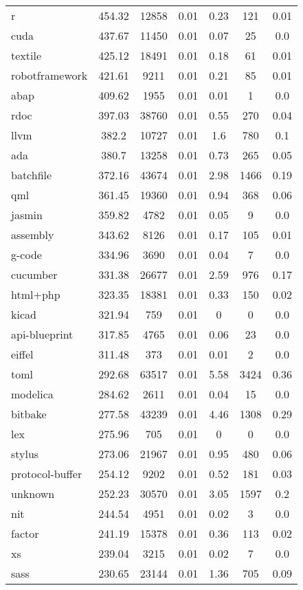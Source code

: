 \begin{longtable}{l|ccc|ccc}
r & 454.32 & 12858 & 0.01 & 0.23 & 121 & 0.01 \\
cuda & 437.67 & 11450 & 0.01 & 0.07 & 25 & 0.0 \\
textile & 425.12 & 18491 & 0.01 & 0.18 & 61 & 0.01 \\
robotframework & 421.61 & 9211 & 0.01 & 0.21 & 85 & 0.01 \\
abap & 409.62 & 1955 & 0.01 & 0.01 & 1 & 0.0 \\
rdoc & 397.03 & 38760 & 0.01 & 0.55 & 270 & 0.04 \\
llvm & 382.2 & 10727 & 0.01 & 1.6 & 780 & 0.1 \\
ada & 380.7 & 13258 & 0.01 & 0.73 & 265 & 0.05 \\
batchfile & 372.16 & 43674 & 0.01 & 2.98 & 1466 & 0.19 \\
qml & 361.45 & 19360 & 0.01 & 0.94 & 368 & 0.06 \\
jasmin & 359.82 & 4782 & 0.01 & 0.05 & 9 & 0.0 \\
assembly & 343.62 & 8126 & 0.01 & 0.17 & 105 & 0.01 \\
g-code & 334.96 & 3690 & 0.01 & 0.04 & 7 & 0.0 \\
cucumber & 331.38 & 26677 & 0.01 & 2.59 & 976 & 0.17 \\
html+php & 323.35 & 18381 & 0.01 & 0.33 & 150 & 0.02 \\
kicad & 321.94 & 759 & 0.01 & 0 & 0 & 0.0 \\
api-blueprint & 317.85 & 4765 & 0.01 & 0.06 & 23 & 0.0 \\
eiffel & 311.48 & 373 & 0.01 & 0.01 & 2 & 0.0 \\
toml & 292.68 & 63517 & 0.01 & 5.58 & 3424 & 0.36 \\
modelica & 284.62 & 2611 & 0.01 & 0.04 & 15 & 0.0 \\
bitbake & 277.58 & 43239 & 0.01 & 4.46 & 1308 & 0.29 \\
lex & 275.96 & 705 & 0.01 & 0 & 0 & 0.0 \\
stylus & 273.06 & 21967 & 0.01 & 0.95 & 480 & 0.06 \\
protocol-buffer & 254.12 & 9202 & 0.01 & 0.52 & 181 & 0.03 \\
unknown & 252.23 & 30570 & 0.01 & 3.05 & 1597 & 0.2 \\
nit & 244.54 & 4951 & 0.01 & 0.02 & 3 & 0.0 \\
factor & 241.19 & 15378 & 0.01 & 0.36 & 113 & 0.02 \\
xs & 239.04 & 3215 & 0.01 & 0.02 & 7 & 0.0 \\
sass & 230.65 & 23144 & 0.01 & 1.36 & 705 & 0.09 \\

\end{longtable}
